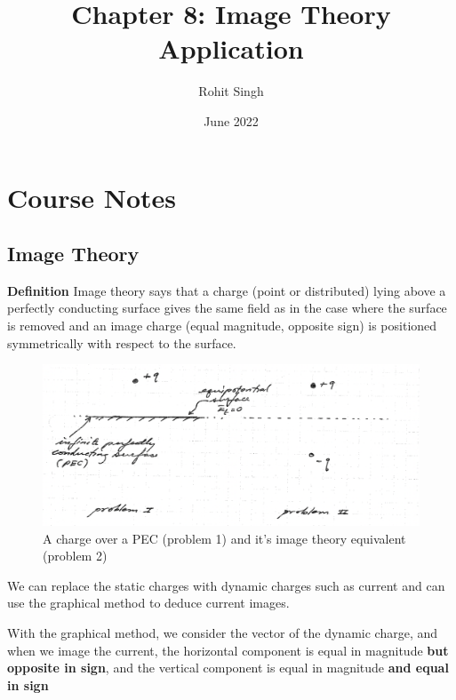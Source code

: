 \documentclass{article}
\title{Chapter 8: Image Theory Application}
\author{Rohit Singh}
\date{June 2022}
\begin{document}
\maketitle

\section{Course Notes}

\subsection{Image Theory}

\textbf{Definition} Image theory says that a charge (point or distributed) lying above a perfectly conducting surface gives the same field as in the case where the surface is removed and an image charge (equal magnitude, opposite sign) is positioned symmetrically with respect to the surface.

\begin{figure}[H]
  \centering
     \includegraphics[scale=0.8]{Course Notes/images/8.1.png}
  \caption{A charge over a PEC (problem 1) and it's image theory equivalent (problem 2)}
\end{figure}

We can replace the static charges with dynamic charges such as current and can use the graphical method to deduce current images.

With the graphical method, we consider the vector of the dynamic charge, and when we image the current, the horizontal component is equal in magnitude \textbf{but opposite in sign}, and the vertical component is equal in magnitude \textbf{and equal in sign}
\end{document}
